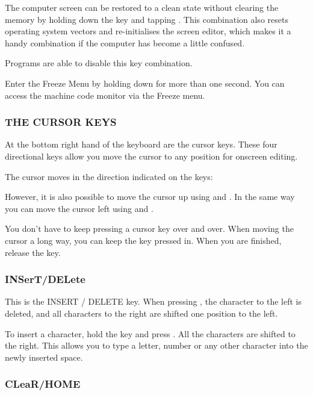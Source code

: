 The computer screen can be restored to a clean state without clearing the memory by holding down the  key and tapping . This combination also resets operating system vectors and re-initialises the screen editor, which makes it a handy combination if the computer has become a little confused.

Programs are able to disable this key combination.

Enter the Freeze Menu by holding down  for more than one second. You can access the machine code monitor via the Freeze menu.

\newpage

\subsubsection{THE CURSOR KEYS}

At the bottom right hand of the keyboard are the cursor keys. These four directional keys allow you move the cursor to any position for onscreen editing.

The cursor moves in the direction indicated on the keys: \megakey{$\leftarrow$} \megakey{$\uparrow$} \megakey{$\rightarrow$} \megakey{$\downarrow$}

However, it is also possible to move the cursor up using  and \megakey{$\downarrow$}. In the same way you can move the cursor left using  and \megakey{$\rightarrow$}.

You don't have to keep pressing a cursor key over and over. When moving the cursor a long way, you can keep the key pressed in. When you are finished, release the key.

\subsubsection{INSerT/DELete}

This is the INSERT / DELETE key. When pressing , the character to the left is deleted, and all characters to the right are shifted one position to the left.

To insert a character, hold the  key and press . All the characters are shifted to the right. This allows you to type a letter, number or any other character into the newly inserted space.


\subsubsection{CLeaR/HOME}

